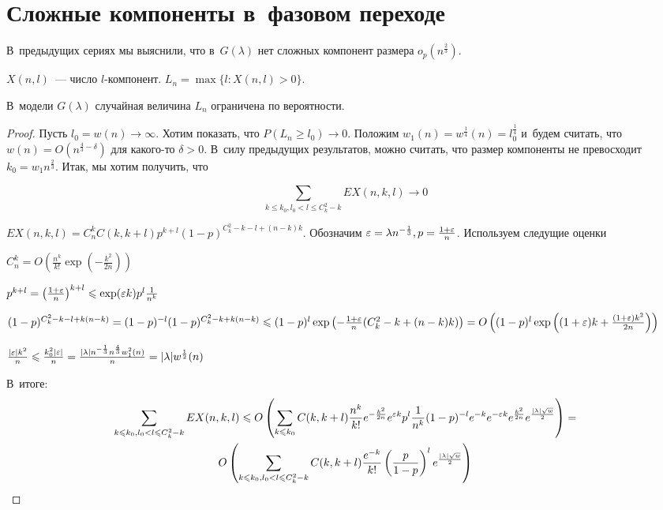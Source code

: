 \documentclass{article}
\begin{document}
\section{Сложные компоненты в~фазовом переходе}

В~предыдущих сериях мы выяснили, что в~$G(\lambda)$ нет сложных компонент размера
$o_p(n^\frac{2}{3})$.

$X(n,l)$~--- число $l$-компонент. $L_n = \max\{l: X(n, l) > 0\}$.

\begin{theorem}
	В~модели $G(\lambda)$ случайная величина $L_n$ ограничена по вероятности.
\end{theorem}
\begin{proof}
	Пусть $l_0 = w(n) \rightarrow \infty$. Хотим показать, что $P(L_n \ge l_0) \rightarrow 0$. Положим
	$w_1(n) = w^\frac{1}{4}(n) = l_0^\frac{1}{4}$ и~будем считать, что $w(n) =
	O(n^{\frac{4}{3}-\delta})$ для какого-то $\delta > 0$. В~силу предыдущих результатов, можно
	считать, что размер компоненты не превосходит $k_0 = w_1 n^\frac{2}{3}$. Итак, мы хотим получить,
	что

	$$\sum\limits_{k \le k_0, l_0 < l \le C_k^2 - k} EX(n, k, l) \rightarrow 0$$

	$EX(n, k, l) = C_n^k C(k, k + l) p^{k+l} (1-p)^{C_k^2 - k - l + (n-k)k}$. Обозначим $\varepsilon =
	\lambda n^{-\frac{1}{3}}, p = \frac{1 + \varepsilon}{n}$. Используем следущие оценки

	$C_n^k = O\left(\frac{n^k}{k!} \exp\left(-\frac{k^2}{2n}\right)\right)$

	$p^{k+l} = \left(\frac{1+\varepsilon}{n}\right)^{k+l} \leqslant \exp(\varepsilon k) p^l \frac{1}{n^k}$

	$(1 - p)^{C_k^2 - k - l + k(n - k)} = (1 - p)^{-l} (1 - p)^{C_k^2 - k + k(n - k)} \leqslant (1 - p)^l
	\exp\left(-\frac{1+\varepsilon}{n} (C_k^2 - k + (n - k)k)\right) = O\left((1 - p)^l
	\exp\left((1 + \varepsilon)k + \frac{(1 + \varepsilon)k^2}{2n}\right)\right)$

	$\frac{|\varepsilon|k^2}{n} \leqslant \frac{k_0^2|\varepsilon|}{n} = \frac{|\lambda| n^{-\frac{1}{3}} n^\frac{4}{3}
	w_1^2(n)}{n} = |\lambda|w^\frac{1}{2}(n)$

	В~итоге:
	\begin{multline*}
		\sum\limits_{k\leqslant k_0, l_0 < l \leqslant C_k^2 - k} EX(n, k, l) \leqslant O\left(\sum\limits_{k\leqslant k_0} C(k, k +
		l) \frac{n^k}{k!} e^{-\frac{k^2}{2n}} e^{\varepsilon k} p^l \frac{1}{n^k} (1 - p)^{-l} e^{-k}
		e^{-\varepsilon k} e^{\frac{k^2}{2n}} e^{\frac{|\lambda|\sqrt{w}}{2}}\right) = \\
		O\left(\sum\limits_{k\leqslant k_0, l_0 <
		l \leqslant C_k^2 - k} C(k, k + l) \frac{e^{-k}}{k!} \left(\frac{p}{1 - p}\right)^l
		e^\frac{|\lambda|\sqrt{w}}{2}\right)
	\end{multline*}


\end{proof}
\end{document}
